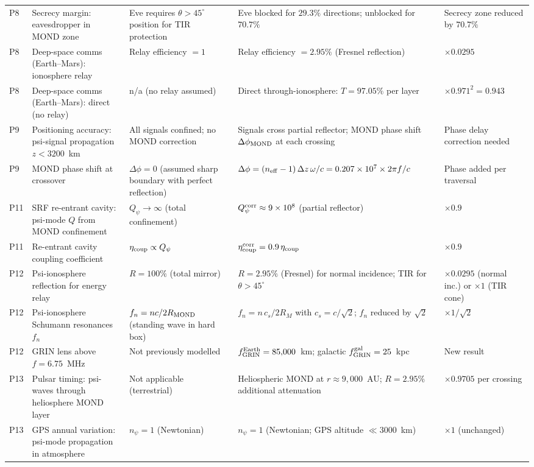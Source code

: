 \documentclass[aps,prd,twocolumn,superscriptaddress]{revtex4-2}
\newcommand{\Qpsi}{Q_\psi}
\newcommand{\npsi}{n_\psi}
\newcommand{\ee}[1]{\times 10^{#1}}
\begin{document}
\begin{table}[ht]
\begin{tabular}{p{0.5cm} p{2.5cm} p{4cm} p{3.5cm} p{2cm}}
P8 & Secrecy margin: eavesdropper in MOND zone & Eve requires $\theta > 45^\circ$ position for TIR protection & Eve blocked for $29.3\%$ directions; unblocked for $70.7\%$ & Secrecy zone reduced by $70.7\%$ \\[2pt]
P8 & Deep-space comms (Earth--Mars): ionosphere relay & Relay efficiency $= 1$ & Relay efficiency $= 2.95\%$ (Fresnel reflection) & $\times 0.0295$ \\[2pt]
P8 & Deep-space comms (Earth--Mars): direct (no relay) & n/a (no relay assumed) & Direct through-ionosphere: $T = 97.05\%$ per layer & $\times 0.971^2 = 0.943$ \\[2pt]
P9 & Positioning accuracy: psi-signal propagation $z < 3200$~km & All signals confined; no MOND correction & Signals cross partial reflector; MOND phase shift $\Delta\phi_{\rm MOND}$ at each crossing & Phase delay correction needed \\[2pt]
P9 & MOND phase shift at crossover & $\Delta\phi = 0$ (assumed sharp boundary with perfect reflection) & $\Delta\phi = (n_{\rm eff} - 1)\,\Delta z\,\omega/c = 0.207 \times 10^7 \times 2\pi f/c$ & Phase added per traversal \\[2pt]
P11 & SRF re-entrant cavity: psi-mode $Q$ from MOND confinement & $\Qpsi \to \infty$ (total confinement) & $\Qpsi^{\rm corr} \approx 9\ee8$ (partial reflector) & $\times 0.9$ \\[2pt]
P11 & Re-entrant cavity coupling coefficient & $\eta_{\rm coup} \propto \Qpsi$ & $\eta_{\rm coup}^{\rm corr} = 0.9\,\eta_{\rm coup}$ & $\times 0.9$ \\[2pt]
P12 & Psi-ionosphere reflection for energy relay & $R = 100\%$ (total mirror) & $R = 2.95\%$ (Fresnel) for normal incidence; TIR for $\theta > 45^\circ$ & $\times 0.0295$ (normal inc.) or $\times 1$ (TIR cone) \\[2pt]
P12 & Psi-ionosphere Schumann resonances $f_n$ & $f_n = nc/2R_{\rm MOND}$ (standing wave in hard box) & $f_n = n\,c_s/2R_M$ with $c_s = c/\sqrt{2}$; $f_n$ reduced by $\sqrt{2}$ & $\times 1/\sqrt{2}$ \\[2pt]
P12 & GRIN lens above $f = 6.75$~MHz & Not previously modelled & $f_{\rm GRIN}^{\rm Earth} = 85{,}000$~km; galactic $f_{\rm GRIN}^{\rm gal} = 25$~kpc & New result \\[2pt]
P13 & Pulsar timing: psi-waves through heliosphere MOND layer & Not applicable (terrestrial) & Heliospheric MOND at $r \approx 9{,}000$~AU; $R = 2.95\%$ additional attenuation & $\times 0.9705$ per crossing \\[2pt]
P13 & GPS annual variation: psi-mode propagation in atmosphere & $\npsi = 1$ (Newtonian) & $\npsi = 1$ (Newtonian; GPS altitude $\ll 3000$~km) & $\times 1$ (unchanged) \\[2pt]

\end{tabular}
\end{table}
\end{document}
